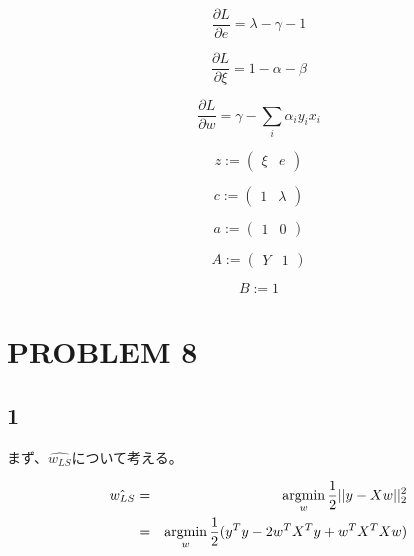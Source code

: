 \documentclass[a4j,11pt]{jarticle}
\newcommand{\argmin}{\mathop{\rm argmin}\limits}
\begin{document}
\begin{equation*}
    \frac{\partial L}{\partial e} = \lambda - \gamma - 1
\end{equation*}

\begin{equation*}
    \frac{\partial L}{\partial \xi} = 1-\alpha-\beta
\end{equation*}

\begin{equation*}
    \frac{\partial L}{\partial w} = \gamma - \sum_i \alpha_i y_i x_i
\end{equation*}

\begin{equation*}
    z :=
    \begin{pmatrix}
        \xi & e
    \end{pmatrix}
\end{equation*}

\begin{equation*}
    c :=
    \begin{pmatrix}
        1 & \lambda
    \end{pmatrix}
\end{equation*}

\begin{equation*}
    a :=
    \begin{pmatrix}
        1 & 0
    \end{pmatrix}
\end{equation*}

\begin{equation*}
    A :=
    \begin{pmatrix}
        Y & 1
    \end{pmatrix}
\end{equation*}

\begin{equation*}
    B := 1
\end{equation*}

\newpage
\section*{PROBLEM 8}
\subsection*{1}
まず、$\hat{w_{LS}}$について考える。

\begin{eqnarray}
    \hat{w_{LS}} &=& \argmin_{w} \frac{1}{2}||y-Xw||^2_2\\
    &=& \argmin_{w} \frac{1}{2}(y^Ty-2w^TX^Ty + w^TX^TXw)
\end{eqnarray}
\end{document}
